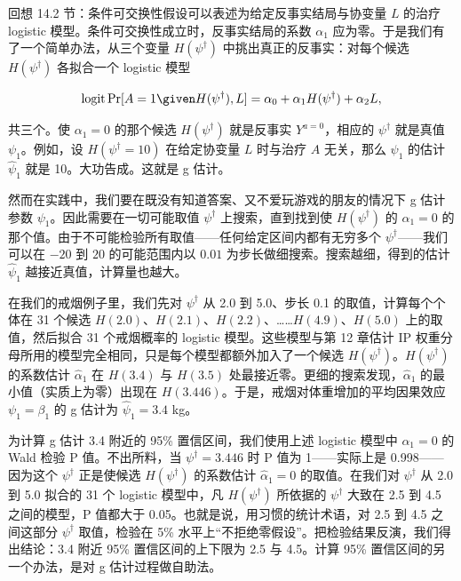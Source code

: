 回想 14.2 节：条件可交换性假设可以表述为给定反事实结局与协变量 $L$ 的治疗 logistic 模型。条件可交换性成立时，反事实结局的系数 $\alpha_1$ 应为零。于是我们有了一个简单办法，从三个变量 $H(\psi^\dagger)$ 中挑出真正的反事实：对每个候选 $H(\psi^\dagger)$ 各拟合一个 logistic 模型

\[
\operatorname{logit}\Pr[A=1\given H(\psi^\dagger),L]=\alpha_0+\alpha_1H(\psi^\dagger)+\alpha_2L,
\]

共三个。使 $\alpha_1=0$ 的那个候选 $H(\psi^\dagger)$ 就是反事实 $Y^{a=0}$，相应的 $\psi^\dagger$ 就是真值 $\psi_1$。例如，设 $H(\psi^\dagger=10)$ 在给定协变量 $L$ 时与治疗 $A$ 无关，那么 $\psi_1$ 的估计 $\hat\psi_1$ 就是 10。大功告成。这就是 g 估计。

\mnote{\textcolor{black!85}{Rosenbaum (1987) 针对不随时间变化的治疗提出了这一过程的一个版本。}\par\vspace{4pt}\textcolor{black!85}{要点：g 估计并不检验条件可交换性是否成立；它假定条件可交换性成立。}}

然而在实践中，我们要在既没有知道答案、又不爱玩游戏的朋友的情况下 g 估计参数 $\psi_1$。因此需要在一切可能取值 $\psi^\dagger$ 上搜索，直到找到使 $H(\psi^\dagger)$ 的 $\alpha_1=0$ 的那个值。由于不可能检验所有取值——任何给定区间内都有无穷多个 $\psi^\dagger$——我们可以在 $-20$ 到 $20$ 的可能范围内以 $0.01$ 为步长做细搜索。搜索越细，得到的估计 $\hat\psi_1$ 越接近真值，计算量也越大。

\mnote{\textcolor{black!85}{代码：程序 14.2}}

在我们的戒烟例子里，我们先对 $\psi^\dagger$ 从 2.0 到 5.0、步长 0.1 的取值，计算每个个体在 31 个候选 $H(2.0)$、$H(2.1)$、$H(2.2)$、……$H(4.9)$、$H(5.0)$ 上的取值，然后拟合 31 个戒烟概率的 logistic 模型。这些模型与第 12 章估计 IP 权重分母所用的模型完全相同，只是每个模型都额外加入了一个候选 $H(\psi^\dagger)$。$H(\psi^\dagger)$ 的系数估计 $\hat\alpha_1$ 在 $H(3.4)$ 与 $H(3.5)$ 处最接近零。更细的搜索发现，$\hat\alpha_1$ 的最小值（实质上为零）出现在 $H(3.446)$。于是，戒烟对体重增加的平均因果效应 $\psi_1=\beta_1$ 的 g 估计为 $\hat\psi_1=3.4$ kg。

为计算 g 估计 3.4 附近的 95\% 置信区间，我们使用上述 logistic 模型中 $\alpha_1=0$ 的 Wald 检验 P 值。不出所料，当 $\psi^\dagger=3.446$ 时 P 值为 1——实际上是 0.998——因为这个 $\psi^\dagger$ 正是使候选 $H(\psi^\dagger)$ 的系数估计 $\hat\alpha_1=0$ 的取值。在我们对 $\psi^\dagger$ 从 2.0 到 5.0 拟合的 31 个 logistic 模型中，凡 $H(\psi^\dagger)$ 所依据的 $\psi^\dagger$ 大致在 2.5 到 4.5 之间的模型，P 值都大于 0.05。也就是说，用习惯的统计术语，对 2.5 到 4.5 之间这部分 $\psi^\dagger$ 取值，检验在 5\% 水平上“不拒绝零假设”。把检验结果反演，我们得出结论：3.4 附近 95\% 置信区间的上下限为 2.5 与 4.5。计算 95\% 置信区间的另一个办法，是对 g 估计过程做自助法。

